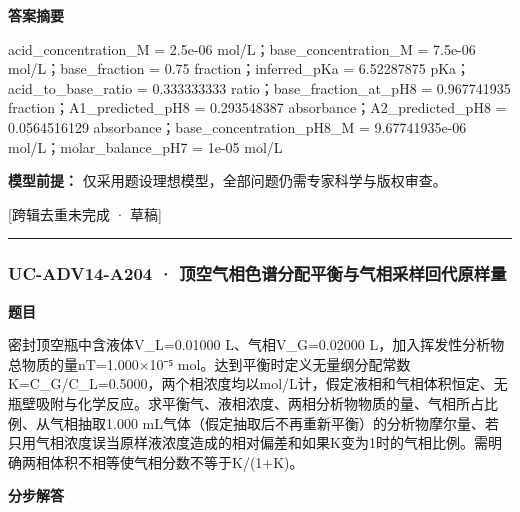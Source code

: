 \documentclass[UTF8,11pt,a4paper]{ctexart}
\begin{document}
\noindent\textbf{答案摘要}\par
acid\_concentration\_M = 2.5e-06 mol/L；base\_concentration\_M = 7.5e-06 mol/L；base\_fraction = 0.75 fraction；inferred\_pKa = 6.52287875 pKa；acid\_to\_base\_ratio = 0.333333333 ratio；base\_fraction\_at\_pH8 = 0.967741935 fraction；A1\_predicted\_pH8 = 0.293548387 absorbance；A2\_predicted\_pH8 = 0.0564516129 absorbance；base\_concentration\_pH8\_M = 9.67741935e-06 mol/L；molar\_balance\_pH7 = 1e-05 mol/L\par
\noindent\textbf{模型前提：}
仅采用题设理想模型，全部问题仍需专家科学与版权审查。\par
\noindent\textcolor{red!65!black}{[跨辑去重未完成 · 草稿]} \par
\medskip\hrule\medskip
{}
\subsubsection*{UC-ADV14-A204 · 顶空气相色谱分配平衡与气相采样回代原样量}
\noindent\textbf{题目}\par
密封顶空瓶中含液体V\_L=0.01000 L、气相V\_G=0.02000 L，加入挥发性分析物总物质的量nT=1.000×10⁻⁵ mol。达到平衡时定义无量纲分配常数K=C\_G/C\_L=0.5000，两个相浓度均以mol/L计，假定液相和气相体积恒定、无瓶壁吸附与化学反应。求平衡气、液相浓度、两相分析物物质的量、气相所占比例、从气相抽取1.000 mL气体（假定抽取后不再重新平衡）的分析物摩尔量、若只用气相浓度误当原样液浓度造成的相对偏差和如果K变为1时的气相比例。需明确两相体积不相等使气相分数不等于K/(1+K)。\par
\medskip\noindent\textbf{分步解答}
\end{document}
